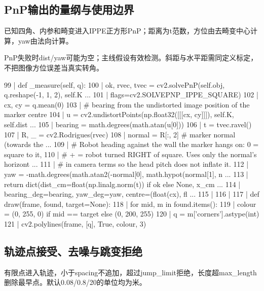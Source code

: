 \subsection{PnP输出的量纲与使用边界}
已知四角、内参和畸变进入IPPE正方形PnP；距离为t范数，方位由去畸变中心计算，yaw由法向计算。

PnP失败时dist/yaw可能为空；主线假设有效检测。斜距与水平距需同定义标定，不把图像方位误差当真实转角。
\begin{CodeBlock}
  99 |     def _measure(self, q):
 100 |         ok, rvec, tvec = cv2.solvePnP(self.obj, q.reshape(-1, 1, 2), self.K ...
 101 |                                       flags=cv2.SOLVEPNP_IPPE_SQUARE)
 102 |         cx, cy = q.mean(0)
 103 |         # bearing from the undistorted image position of the marker centre
 104 |         u = cv2.undistortPoints(np.float32([[[cx, cy]]]), self.K, self.dist ...
 105 |         bearing = math.degrees(math.atan(u[0]))
 106 |         t = tvec.ravel()
 107 |         R, _ = cv2.Rodrigues(rvec)
 108 |         normal = R[:, 2]                      # marker normal (towards the  ...
 109 |         # Robot heading against the wall the marker hangs on: 0 = square to it,
 110 |         # + = robot turned RIGHT of square. Uses only the normal's horizont ...
 111 |         # in camera terms so the head pitch does not inflate it.
 112 |         yaw = -math.degrees(math.atan2(-normal[0], math.hypot(normal[1], n  ...
 113 |         return dict(dist_cm=float(np.linalg.norm(t)) if ok else None, x_cm  ...
 114 |                     bearing_deg=bearing, yaw_deg=yaw, centre=(float(cx), fl ...
 115 | 
 116 | 
 117 | def draw(frame, found, target=None):
 118 |     for mid, m in found.items():
 119 |         colour = (0, 255, 0) if mid == target else (0, 200, 255)
 120 |         q = m['corners'].astype(int)
 121 |         cv2.polylines(frame, [q], True, colour, 3)
\end{CodeBlock}
\subsection{轨迹点接受、去噪与跳变拒绝}
有限点进入轨迹，小于spacing不追加，超过jump\_limit拒绝，长度超max\_length删除最早点。默认0.08/0.8/20的单位均为米。


